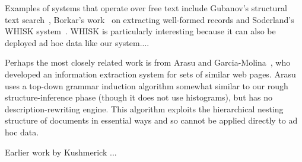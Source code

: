 
Examples of systems that operate over free text include
Gubanov's structural text search~\cite{gubanov+:structural-text-search},
Borkar's work~\cite{borkar+:text-segmentation} on extracting well-formed
records and 
Soderland's WHISK system~\cite{soderland:whisk}.  WHISK is particularly
interesting because it can also be deployed ad hoc data like our system....

Perhaps the most closely related work is from Arasu and 
Garcia-Molina~\cite{arasu+:sigmod03}, who developed an information
extraction system for sets of similar web pages.  
Arasu uses a top-down grammar induction
algorithm somewhat similar to our rough structure-inference phase
(though it does not use histograms),
but has no description-rewriting engine.  
This algorithm exploits the hierarchical nesting
structure of \xml{} documents in essential ways
and so cannot be applied directly to ad hoc data.  


Earlier work by Kushmerick ...



